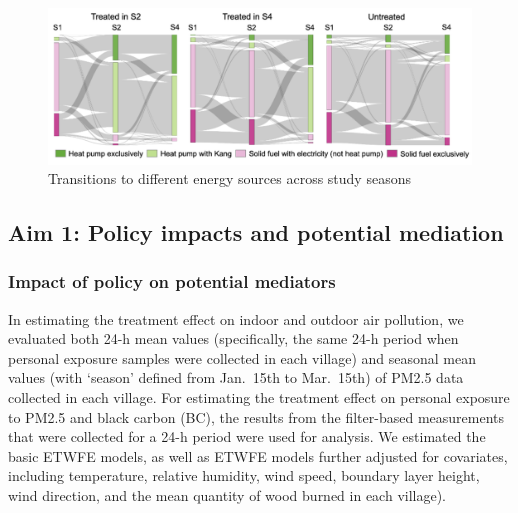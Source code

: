 \documentclass[
  letterpaper,
  DIV=11,
  numbers=noendperiod]{scrartcl}
\begin{document}
\begin{figure}[H]

{\centering \includegraphics[width=1\textwidth,height=\textheight]{images/sankey.png}

}

\caption{\label{fig-sankey}Transitions to different energy sources
across study seasons}

\end{figure}

\hypertarget{aim-1-policy-impacts-and-potential-mediation}{%
\subsection{Aim 1: Policy impacts and potential
mediation}\label{aim-1-policy-impacts-and-potential-mediation}}

\hypertarget{impact-of-policy-on-potential-mediators}{%
\subsubsection{Impact of policy on potential
mediators}\label{impact-of-policy-on-potential-mediators}}

In estimating the treatment effect on indoor and outdoor air pollution,
we evaluated both 24-h mean values (specifically, the same 24-h period
when personal exposure samples were collected in each village) and
seasonal mean values (with `season' defined from Jan.~15th to Mar.~15th)
of PM2.5 data collected in each village. For estimating the treatment
effect on personal exposure to PM2.5 and black carbon (BC), the results
from the filter-based measurements that were collected for a 24-h period
were used for analysis. We estimated the basic ETWFE models, as well as
ETWFE models further adjusted for covariates, including temperature,
relative humidity, wind speed, boundary layer height, wind direction,
and the mean quantity of wood burned in each village).
\end{document}

